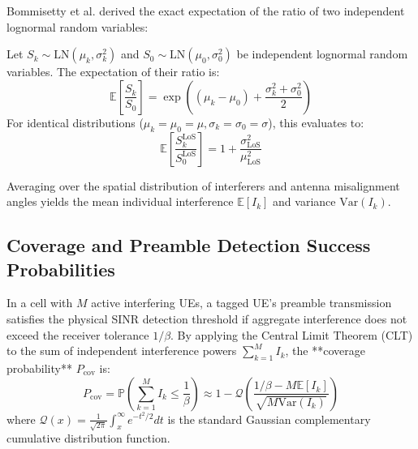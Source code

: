 Bommisetty et al. \cite{bommisetty2022mmwave} derived the exact expectation of the ratio of two independent lognormal random variables:
\begin{theorem}
Let $S_k \sim \mathrm{LN}(\mu_k, \sigma_k^2)$ and $S_0 \sim \mathrm{LN}(\mu_0, \sigma_0^2)$ be independent lognormal random variables. The expectation of their ratio is:
\begin{equation}
    \mathbb{E}\left[ \frac{S_k}{S_0} \right] = \exp\left( (\mu_k - \mu_0) + \frac{\sigma_k^2 + \sigma_0^2}{2} \right)
\end{equation}
For identical distributions ($\mu_k = \mu_0 = \mu, \sigma_k = \sigma_0 = \sigma$), this evaluates to:
\begin{equation}
    \mathbb{E}\left[ \frac{S_k^{\mathrm{LoS}}}{S_0^{\mathrm{LoS}}} \right] = 1 + \frac{\sigma_{\mathrm{LoS}}^2}{\mu_{\mathrm{LoS}}^2}
\end{equation}
\end{theorem}

Averaging over the spatial distribution of interferers and antenna misalignment angles yields the mean individual interference $\mathbb{E}[I_k]$ and variance $\mathrm{Var}(I_k)$.

\subsection{Coverage and Preamble Detection Success Probabilities}
In a cell with $M$ active interfering UEs, a tagged UE's preamble transmission satisfies the physical SINR detection threshold if aggregate interference does not exceed the receiver tolerance $1/\beta$. By applying the Central Limit Theorem (CLT) to the sum of independent interference powers $\sum_{k=1}^M I_k$, the **coverage probability** $P_{\mathrm{cov}}$ is:
\begin{equation}
    \label{eq:Pcov_clt}
    P_{\mathrm{cov}} = \mathbb{P}\left( \sum_{k=1}^M I_k \le \frac{1}{\beta} \right) \approx 1 - \mathcal{Q}\left( \frac{1/\beta - M \mathbb{E}[I_k]}{\sqrt{M \mathrm{Var}(I_k)}} \right)
\end{equation}
where $\mathcal{Q}(x) = \frac{1}{\sqrt{2\pi}} \int_x^\infty e^{-t^2/2} dt$ is the standard Gaussian complementary cumulative distribution function.

